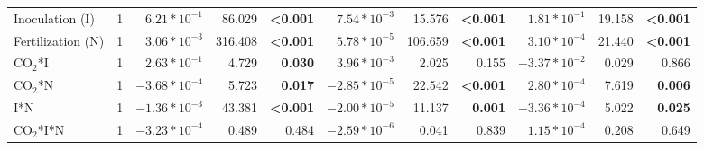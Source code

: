 \begin{landscape}
\begin{table}
{\begin{tabular}{p{3cm}p{0.5cm}p{1.75cm}p{1.5cm}p{1.5cm}p{1.75cm}p{1.5cm}p{1.5cm}p{1.75cm}p{1.5cm}p{1.5cm}}
            Inoculation (I) & \multicolumn{1}{r}{1}
            & \multicolumn{1}{r}{$6.21*10^{-1}$}    & \multicolumn{1}{r}{ 86.029}   & \multicolumn{1}{r}{\textbf{<0.001}}
            & \multicolumn{1}{r}{$7.54*10^{-3}$}    & \multicolumn{1}{r}{ 15.576}   & \multicolumn{1}{r}{\textbf{<0.001}}
            & \multicolumn{1}{r}{$1.81*10^{-1}$}    & \multicolumn{1}{r}{ 19.158}   & \multicolumn{1}{r}{\textbf{<0.001}} 
            \\

            Fertilization (N) & \multicolumn{1}{r}{1}
            & \multicolumn{1}{r}{$3.06*10^{-3}$}    & \multicolumn{1}{r}{316.408}   & \multicolumn{1}{r}{\textbf{<0.001}}
            & \multicolumn{1}{r}{$5.78*10^{-5}$}    & \multicolumn{1}{r}{106.659}   & \multicolumn{1}{r}{\textbf{<0.001}}
            & \multicolumn{1}{r}{$3.10*10^{-4}$}    & \multicolumn{1}{r}{ 21.440}   & \multicolumn{1}{r}{\textbf{<0.001}} 
            \\

            CO$_2$*I & \multicolumn{1}{r}{1}
            & \multicolumn{1}{r}{$2.63*10^{-1}$}    & \multicolumn{1}{r}{4.729}     & \multicolumn{1}{r}{\textbf{0.030}}
            & \multicolumn{1}{r}{$3.96*10^{-3}$}    & \multicolumn{1}{r}{2.025}     & \multicolumn{1}{r}{0.155}
            & \multicolumn{1}{r}{$-3.37*10^{-2}$}   & \multicolumn{1}{r}{0.029}     & \multicolumn{1}{r}{0.866} 
            \\

            CO$_2$*N & \multicolumn{1}{r}{1}
            & \multicolumn{1}{r}{$-3.68*10^{-4}$}   & \multicolumn{1}{r}{5.723}     & \multicolumn{1}{r}{\textbf{ 0.017}}
            & \multicolumn{1}{r}{$-2.85*10^{-5}$}   & \multicolumn{1}{r}{22.542}    & \multicolumn{1}{r}{\textbf{<0.001}}
            & \multicolumn{1}{r}{$2.80*10^{-4}$}    & \multicolumn{1}{r}{7.619}     & \multicolumn{1}{r}{\textbf{0.006}} 
            \\

            I*N & \multicolumn{1}{r}{1}
            & \multicolumn{1}{r}{$-1.36*10^{-3}$}   & \multicolumn{1}{r}{43.381}    & \multicolumn{1}{r}{\textbf{<0.001}}
            & \multicolumn{1}{r}{$-2.00*10^{-5}$}   & \multicolumn{1}{r}{11.137}    & \multicolumn{1}{r}{\textbf{0.001}}
            & \multicolumn{1}{r}{$-3.36*10^{-4}$}   & \multicolumn{1}{r}{5.022}     & \multicolumn{1}{r}{\textbf{0.025}} 
            \\

            CO$_2$*I*N & \multicolumn{1}{r}{1}
            & \multicolumn{1}{r}{$-3.23*10^{-4}$}   & \multicolumn{1}{r}{0.489}     & \multicolumn{1}{r}{0.484}
            & \multicolumn{1}{r}{$-2.59*10^{-6}$}   & \multicolumn{1}{r}{0.041}     & \multicolumn{1}{r}{0.839}
            & \multicolumn{1}{r}{$1.15*10^{-4}$}    & \multicolumn{1}{r}{0.208}     & \multicolumn{1}{r}{0.649} 
            \\
            \hline


\end{tabular}}
\end{table}
\end{landscape}
